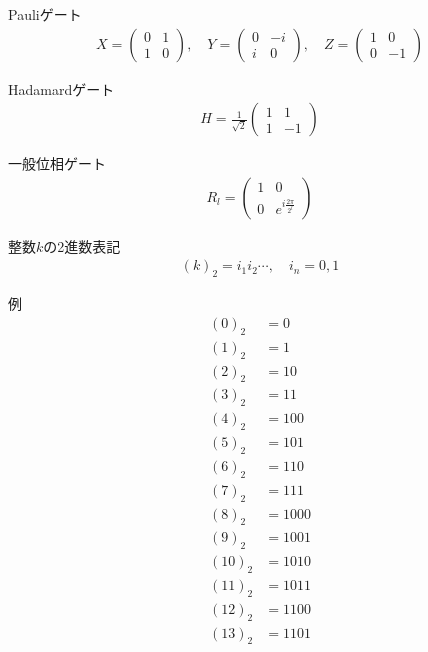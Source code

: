 \documentclass[]{ltjsarticle}
\begin{document}
Pauliゲート
\begin{align}
    X = 
    \begin{pmatrix}
    0 & 1 \\ 1 & 0     
    \end{pmatrix},\quad 
    Y = 
    \begin{pmatrix}
    0 & -i \\ i & 0     
    \end{pmatrix},\quad 
    Z = 
    \begin{pmatrix}
    1 & 0 \\ 0 & -1     
    \end{pmatrix} 
\end{align}

Hadamardゲート
\begin{align}
    H 
    = 
    \frac{1}{\sqrt{2}}
    \begin{pmatrix}
        1 & 1 \\
        1 & -1
    \end{pmatrix}
\end{align}

一般位相ゲート
\begin{align}
    R_l
    =
    \begin{pmatrix}
        1 & 0 \\
        0 & e^{i\frac{2\pi}{2^l}}
    \end{pmatrix}
\end{align}

整数$k$の2進数表記
\begin{align}
    (k)_2 = i_1 i_2 \cdots, \quad i_n = 0, 1
\end{align}

例
\begin{align}
    (0)_2 &= 0 \\
    (1)_2 &= 1 \\
    (2)_2 &= 10 \\
    (3)_2 &= 11 \\
    (4)_2 &= 100 \\
    (5)_2 &= 101 \\
    (6)_2 &= 110 \\
    (7)_2 &= 111 \\
    (8)_2 &= 1000 \\
    (9)_2 &= 1001 \\
    (10)_2 &= 1010 \\
    (11)_2 &= 1011 \\
    (12)_2 &= 1100 \\
    (13)_2 &= 1101
\end{align}
\end{document}
